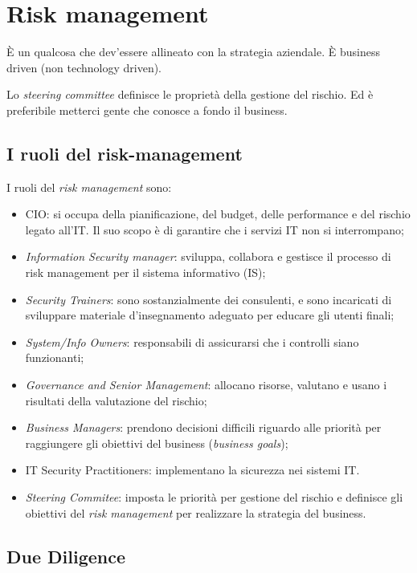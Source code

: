 \section{Risk management}

È un qualcosa che dev'essere allineato con la strategia aziendale.
È business driven (non technology driven).

Lo \textit{steering committee} definisce le proprietà della gestione del
rischio. Ed è preferibile metterci gente che conosce a fondo il business.

\subsection{I ruoli del risk-management}

I ruoli del \textit{risk management} sono:
\begin{itemize}
\item CIO: si occupa della pianificazione, del budget,
delle performance e del rischio legato all'IT. Il suo scopo
è di garantire che i servizi IT non si interrompano;
\item \textit{Information Security manager}: sviluppa, collabora e gestisce
il processo di risk management per il sistema informativo (IS);
\item \textit{Security Trainers}: sono sostanzialmente dei consulenti, e sono incaricati
di sviluppare materiale d'insegnamento adeguato per educare gli utenti finali;
\item \textit{System/Info Owners}: responsabili di assicurarsi che i controlli siano
funzionanti;
\item \textit{Governance and Senior Management}: allocano risorse, valutano e usano i
risultati della valutazione del rischio;
\item \textit{Business Managers}: prendono decisioni difficili riguardo alle priorità
per raggiungere gli obiettivi del business (\textit{business goals});
\item IT Security Practitioners: implementano la sicurezza nei sistemi IT.
\item \textit{Steering Commitee}: imposta le priorità per gestione del
rischio e definisce gli obiettivi del \textit{risk management} per realizzare la
strategia del business.
\end{itemize}

\subsection{Due Diligence}

